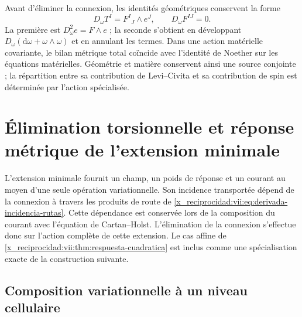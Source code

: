 \begin{HMTCompactSection}
Avant d'éliminer la connexion, les identités géométriques conservent
la forme
\begin{equation}
 D_\omega T^I=F^I{}_{J}\wedge e^J,\qquad D_\omega F^{IJ}=0.
 \label{x_reciprocidad:vii:eq:bianchi-cartan}
\end{equation}
La première est \(D_\omega^2e=F\wedge e\) ; la seconde s'obtient
en développant \(D_\omega(\mathrm d\omega+\omega\wedge\omega)\)
et en annulant les termes. Dans une action matérielle covariante, le
bilan métrique total coïncide avec l'identité de Noether sur les
équations matérielles. Géométrie et matière conservent ainsi une source
conjointe ; la répartition entre sa contribution de Levi--Civita et sa
contribution de spin est déterminée par l'action spécialisée.


\end{HMTCompactSection}


\chapter{Élimination torsionnelle et réponse métrique de l'extension minimale}
\label{x_reciprocidad:vii:sec:eliminacion-torsional-no-lineal}

L'extension minimale fournit un champ, un poids de réponse et un courant au moyen d'une seule opération variationnelle. Son incidence transportée dépend de la connexion à travers les produits de route de \eqref{x_reciprocidad:vii:eq:derivada-incidencia-rutas}. Cette dépendance est conservée lors de la composition du courant avec l'équation de Cartan--Holst. L'élimination de la connexion s'effectue donc sur l'action complète de cette extension. Le cas affine de \ref{x_reciprocidad:vii:thm:respuesta-cuadratica} est inclus comme une spécialisation exacte de la construction suivante.

\section{Composition variationnelle à un niveau cellulaire}
\label{x_reciprocidad:vii:subsec:composicion-torsional-celular}

